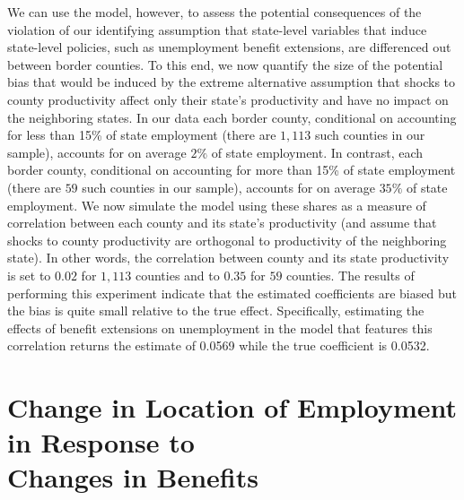 \documentclass[12pt]{article}
\newcommand{\1}{\mathbf{1}}
\begin{document}
\begin{appendix}
We can use the model, however, to assess the potential consequences of the violation of our identifying assumption that state-level variables that induce state-level policies, such as unemployment benefit extensions, are differenced out between border counties. To this end, we now quantify the size of the potential bias that would be induced by the extreme alternative assumption that shocks to county productivity affect only their state's productivity and have no impact on the neighboring states. In our data each border county, conditional on accounting for less than 15\% of state employment (there are $1,113$ such counties in our sample), accounts for on average $2\%$ of state employment. In contrast, each border county, conditional on accounting for more than 15\% of state employment (there are $59$ such counties in our sample), accounts for on average $35\%$ of state employment. We now simulate the model using these shares as a measure of correlation between each county and its state's productivity (and assume that shocks to county productivity are orthogonal to productivity of the neighboring state). In other words, the correlation between county and its state productivity is set to $0.02$ for $1,113$ counties and to $0.35$ for $59$ counties. The results of performing this experiment indicate that the estimated coefficients are biased but the bias is quite small relative to the true effect. Specifically, estimating the effects of benefit extensions on unemployment in the model that features this correlation returns the estimate of 0.0569 while the true coefficient is 0.0532.


\section{Change in Location of Employment in Response to \\ Changes in Benefits}
\label{sec:mobility}


\end{appendix}
\end{document}
